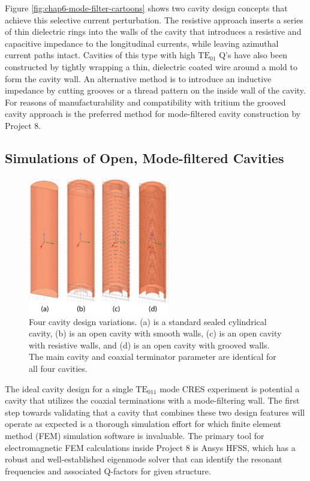 Figure \ref{fig:chap6-mode-filter-cartoons} shows two cavity design concepts that achieve this selective current perturbation. The resistive approach inserts a series of thin dielectric rings into the walls of the cavity that introduces a resistive and capacitive impedance to the longitudinal currents, while leaving azimuthal current paths intact. Cavities of this type with high $\mathrm{TE}_{01}$ Q's have also been constructed by tightly wrapping a thin, dielectric coated wire around a mold to form the cavity wall. An alternative method is to introduce an inductive impedance by cutting grooves or a thread pattern on the inside wall of the cavity. For reasons of manufacturability and compatibility with tritium the grooved cavity approach is the preferred method for mode-filtered cavity construction by Project 8. 

\subsection{Simulations of Open, Mode-filtered Cavities}

\begin{figure}[htbp]
    \centering
    \includegraphics*[width=0.55\textwidth]{figs/Chapter-6/230610_cavity_variations.png}
    \caption{\label{fig:chap6-cavity-variations} Four cavity design variations. (a) is a standard sealed cylindrical cavity, (b) is an open cavity with smooth walls, (c) is an open cavity with resistive walls, and (d) is an open cavity with grooved walls. The main cavity and coaxial terminator parameter are identical for all four cavities.}
\end{figure}

The ideal cavity design for a single $\mathrm{TE}_{011}$ mode CRES experiment is potential a cavity that utilizes the coaxial terminations with a mode-filtering wall. The first step towards validating that a cavity that combines these two design features will operate as expected is a thorough simulation effort for which finite element method (FEM) simulation software is invaluable. The primary tool for electromagnetic FEM calculations inside Project 8 is Ansys HFSS, which has a robust and well-established eigenmode solver that can identify the resonant frequencies and associated Q-factors for given structure. 

